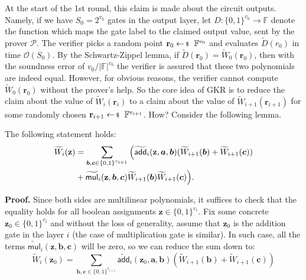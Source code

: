 At the start of the 1st round, this claim is made about the circuit outputs.
Namely, if we have $S_0=2^{v_0}$ gates in the output layer, let $D:
\{0,1\}^{v_0} \to \mathbb{F}$ denote the function which maps the gate label to
the claimed output value, sent by the prover $\mathcal{P}$. The verifier picks a
random point $\mathbf{r}_0 \leftarrowS \mathbb{F}^{v_0}$ and evaluates
$\widetilde{D}(r_0)$ in time $\mathcal{O}(S_0)$. By the Schwartz-Zippel lemma,
if $\widetilde{D}(\mathbf{r}_0)=\widetilde{W}_0(\mathbf{r}_0)$, then with the
soundness error of $v_0/|\mathbb{F}|^{v_0}$ the verifier is assured that these
two polynomials are indeed equal. However, for obvious reasons, the verifier
cannot compute $\widetilde{W}_0(\mathbf{r}_0)$ without the prover's help. So the
core idea of GKR is to reduce the claim about the value of
$\widetilde{W}_i(\mathbf{r}_i)$ to a claim about the value of
$\widetilde{W}_{i+1}(\mathbf{r}_{i+1})$ for some randomly chosen
$\mathbf{r}_{i+1} \leftarrowS \mathbb{F}^{v_{i+1}}$. How? Consider the
following lemma.

\begin{lemma}
    The following statement holds:
    \begin{align*}
        \small\widetilde{W}_i(\mathbf{z}) &= \sum_{\boldsymbol{b},\boldsymbol{c} \in \{0,1\}^{v_{i+1}}} \Big(\widetilde{\mathsf{add}}_i(\mathbf{z},\boldsymbol{a},\boldsymbol{b})(\widetilde{W}_{i+1}(\boldsymbol{b}) + \widetilde{W}_{i+1}(\boldsymbol{c})) \\
        &+ \widetilde{\mathsf{mul}}_i(\mathbf{z},\boldsymbol{b},\boldsymbol{c})\widetilde{W}_{i+1}(\boldsymbol{b})\widetilde{W}_{i+1}(\boldsymbol{c})\Big).
    \end{align*}
\end{lemma}

\textbf{Proof.} Since both sides are multilinear polynomials, it suffices to
check that the equality holds for all boolean assignments $\mathbf{z} \in
\{0,1\}^{v_i}$. Fix some concrete $\mathbf{z}_0 \in \{0,1\}^{v_i}$ and without
the loss of generality, assume that $\mathbf{z}_0$ is the addition gate in the
layer $i$ (the case of multiplication gate is similar). In such case, all 
the terms $\widetilde{\mathsf{mul}}_i(\mathbf{z},\boldsymbol{b},\boldsymbol{c})$ 
will be zero, so we can reduce the sum down to:
\begin{equation*}
    \widetilde{W}_i(\mathbf{z}_0) = \sum_{\boldsymbol{b},\boldsymbol{c} \in \{0,1\}^{v_{i+1}}} \widetilde{\mathsf{add}}_i(\mathbf{z}_0,\boldsymbol{a},\boldsymbol{b})(\widetilde{W}_{i+1}(\boldsymbol{b}) + \widetilde{W}_{i+1}(\boldsymbol{c}))
\end{equation*}

